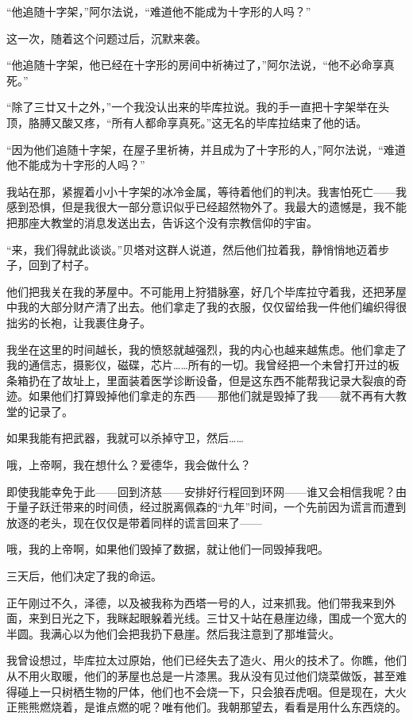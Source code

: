 \documentclass[AutoFakeBold=true]{book}
\begin{document}
``他追随十字架，''阿尔法说，``难道他不能成为十字形的人吗？''

这一次，随着这个问题过后，沉默来袭。

``他追随十字架，他已经在十字形的房间中祈祷过了，''阿尔法说，``他不必命享真死。''

``除了三廿又十之外，''一个我没认出来的毕库拉说。我的手一直把十字架举在头顶，胳膊又酸又疼，``所有人都命享真死。''这无名的毕库拉结束了他的话。

``因为他们追随十字架，在屋子里祈祷，并且成为了十字形的人，''阿尔法说，``难道他不能成为十字形的人吗？''

我站在那，紧握着小小十字架的冰冷金属，等待着他们的判决。我害怕死亡——我感到恐惧，但是我很大一部分意识似乎已经超然物外了。我最大的遗憾是，我不能把那座大教堂的消息发送出去，告诉这个没有宗教信仰的宇宙。

``来，我们得就此谈谈。''贝塔对这群人说道，然后他们拉着我，静悄悄地迈着步子，回到了村子。

他们把我关在我的茅屋中。不可能用上狩猎脉塞，好几个毕库拉守着我，还把茅屋中我的大部分财产清了出去。他们拿走了我的衣服，仅仅留给我一件他们编织得很拙劣的长袍，让我裹住身子。

我坐在这里的时间越长，我的愤怒就越强烈，我的内心也越来越焦虑。他们拿走了我的通信志，摄影仪，磁碟，芯片……所有的一切。我曾经把一个未曾打开过的板条箱扔在了故址上，里面装着医学诊断设备，但是这东西不能帮我记录大裂痕的奇迹。如果他们打算毁掉他们拿走的东西——那他们就是毁掉了我——就不再有大教堂的记录了。

如果我能有把武器，我就可以杀掉守卫，然后……

哦，上帝啊，我在想什么？爱德华，我会做什么？

即使我能幸免于此——回到济慈——安排好行程回到环网——谁又会相信我呢？由于量子跃迁带来的时间债，经过脱离佩森的``九年''时间，一个先前因为谎言而遭到放逐的老头，现在仅仅是带着同样的谎言回来了——

哦，我的上帝啊，如果他们毁掉了数据，就让他们一同毁掉我吧。

\vspace*{1em}{\kaishu 第一百一十日：}

三天后，他们决定了我的命运。

正午刚过不久，泽德，以及被我称为西塔一号的人，过来抓我。他们带我来到外面，来到日光之下，我眯起眼躲着光线。三廿又十站在悬崖边缘，围成一个宽大的半圆。我满心以为他们会把我扔下悬崖。然后我注意到了那堆营火。

我曾设想过，毕库拉太过原始，他们已经失去了造火、用火的技术了。你瞧，他们从不用火取暖，他们的茅屋也总是一片漆黑。我从没有见过他们烧菜做饭，甚至难得碰上一只树栖生物的尸体，他们也不会烧一下，只会狼吞虎咽。但是现在，大火正熊熊燃烧着，是谁点燃的呢？唯有他们。我朝那望去，看看是用什么东西烧的。
\end{document}
